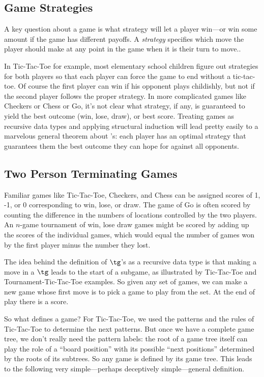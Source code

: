 \subsection{Game Strategies}
A key question about a game is what strategy will let a player
win---or win some amount if the game has different payoffs.  A
\emph{strategy} specifies which move the player should make at any
point in the game when it is their turn to move..

In Tic-Tac-Toe for example, most elementary school children figure out
strategies for both players so that each player can force the game to
end without a tic-tac-toe.  Of course the first player can win if his
opponent plays childishly, but not if the second player follows the
proper strategy.  In more complicated games like Checkers or Chess or
Go, it's not clear what strategy, if any, is guaranteed to yield the
best outcome (win, lose, draw), or best score.  Treating games as
recursive data types and applying structural induction will lead
pretty easily to a marvelous general theorem about \tg's: each player
has an optimal strategy that guarantees them the best outcome they can
hope for against all opponents.

\subsection{Two Person Terminating Games}

Familiar games like Tic-Tac-Toe, Checkers, and Chess can be assigned
scores of 1, -1, or 0 corresponding to win, lose, or draw.  The game of Go
is often scored by counting the difference in the numbers of locations
controlled by the two players.  An $n$-game tournament of win, lose draw
games might be scored by adding up the scores of the individual games,
which would equal the number of games won by the first player minus the
number they lost.  \iffalse A negative score would mean the second player
won more games.\fi

The idea behind the definition of $\tg$'s as a recursive data type is that
making a move in a $\tg$ leads to the start of a subgame, as illustrated
by Tic-Tac-Toe and Tournament-Tic-Tac-Toe examples.  So given any set of
games, we can make a new game whose first move is to pick a game to play
from the set.  At the end of play there is a score.

So what defines a game?  For Tic-Tac-Toe, we used the patterns and the
rules of Tic-Tac-Toe to determine the next patterns.  But once we have
a complete game tree, we don't really need the pattern labels: the
root of a game tree itself can play the role of a ``board position''
with its possible ``next positions'' determined by the roots of its
subtrees.  So any game is defined by its game tree.  This leads to the
following very simple---perhaps deceptively simple---general
definition.

